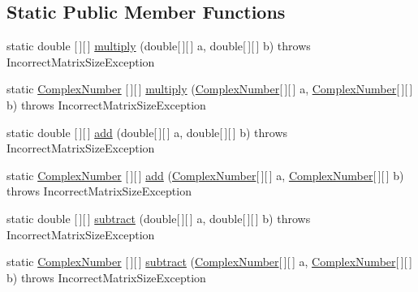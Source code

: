 \subsection*{Static Public Member Functions}
\begin{DoxyCompactItemize}
\item 
static double \mbox{[}$\,$\mbox{]}\mbox{[}$\,$\mbox{]} \hyperlink{classcom_1_1ars_1_1quantum_1_1utils_1_1_matrix_operations_a0739b9c18cbe7d85ae01056f4b7e08d9}{multiply} (double\mbox{[}$\,$\mbox{]}\mbox{[}$\,$\mbox{]} a, double\mbox{[}$\,$\mbox{]}\mbox{[}$\,$\mbox{]} b)  throws Incorrect\+Matrix\+Size\+Exception 
\item 
static \hyperlink{classcom_1_1ars_1_1complexnumbers_1_1_complex_number}{Complex\+Number} \mbox{[}$\,$\mbox{]}\mbox{[}$\,$\mbox{]} \hyperlink{classcom_1_1ars_1_1quantum_1_1utils_1_1_matrix_operations_ae7c98406e2a3c1d35d78538d82bd637d}{multiply} (\hyperlink{classcom_1_1ars_1_1complexnumbers_1_1_complex_number}{Complex\+Number}\mbox{[}$\,$\mbox{]}\mbox{[}$\,$\mbox{]} a, \hyperlink{classcom_1_1ars_1_1complexnumbers_1_1_complex_number}{Complex\+Number}\mbox{[}$\,$\mbox{]}\mbox{[}$\,$\mbox{]} b)  throws Incorrect\+Matrix\+Size\+Exception 
\item 
static double \mbox{[}$\,$\mbox{]}\mbox{[}$\,$\mbox{]} \hyperlink{classcom_1_1ars_1_1quantum_1_1utils_1_1_matrix_operations_af6e0ec44a13d9a89b249606514378bf8}{add} (double\mbox{[}$\,$\mbox{]}\mbox{[}$\,$\mbox{]} a, double\mbox{[}$\,$\mbox{]}\mbox{[}$\,$\mbox{]} b)  throws Incorrect\+Matrix\+Size\+Exception 
\item 
static \hyperlink{classcom_1_1ars_1_1complexnumbers_1_1_complex_number}{Complex\+Number} \mbox{[}$\,$\mbox{]}\mbox{[}$\,$\mbox{]} \hyperlink{classcom_1_1ars_1_1quantum_1_1utils_1_1_matrix_operations_aa9b253355d52423992f5208ff2d72b15}{add} (\hyperlink{classcom_1_1ars_1_1complexnumbers_1_1_complex_number}{Complex\+Number}\mbox{[}$\,$\mbox{]}\mbox{[}$\,$\mbox{]} a, \hyperlink{classcom_1_1ars_1_1complexnumbers_1_1_complex_number}{Complex\+Number}\mbox{[}$\,$\mbox{]}\mbox{[}$\,$\mbox{]} b)  throws Incorrect\+Matrix\+Size\+Exception 
\item 
static double \mbox{[}$\,$\mbox{]}\mbox{[}$\,$\mbox{]} \hyperlink{classcom_1_1ars_1_1quantum_1_1utils_1_1_matrix_operations_a7ccc1120dba8158f6cb778ad6a55927d}{subtract} (double\mbox{[}$\,$\mbox{]}\mbox{[}$\,$\mbox{]} a, double\mbox{[}$\,$\mbox{]}\mbox{[}$\,$\mbox{]} b)  throws Incorrect\+Matrix\+Size\+Exception 
\item 
static \hyperlink{classcom_1_1ars_1_1complexnumbers_1_1_complex_number}{Complex\+Number} \mbox{[}$\,$\mbox{]}\mbox{[}$\,$\mbox{]} \hyperlink{classcom_1_1ars_1_1quantum_1_1utils_1_1_matrix_operations_a99b64f57485b148b298a3a7e08c002f6}{subtract} (\hyperlink{classcom_1_1ars_1_1complexnumbers_1_1_complex_number}{Complex\+Number}\mbox{[}$\,$\mbox{]}\mbox{[}$\,$\mbox{]} a, \hyperlink{classcom_1_1ars_1_1complexnumbers_1_1_complex_number}{Complex\+Number}\mbox{[}$\,$\mbox{]}\mbox{[}$\,$\mbox{]} b)  throws Incorrect\+Matrix\+Size\+Exception 

\end{DoxyCompactItemize}
